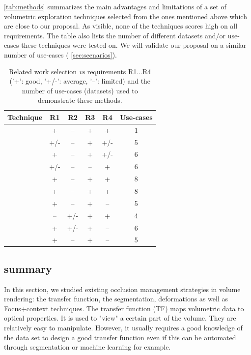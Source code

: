\autoref{tab:methods} summarizes the main advantages and limitations of a set of volumetric exploration techniques selected from the ones mentioned above which are close to our proposal. As visible, none of the techniques scores high on all requirements. The table also lists the number of different datasets and/or use-cases these techniques were tested on. We will validate our proposal on a similar number of use-cases ( \autoref{sec:scenarios}).
\begin{table}
\centering
\large
\begin{tabular}{ |c|c|c|c|c|c| }
\hline
\textbf{Technique} & \textbf{R1} & \textbf{R2} & \textbf{R3} & \textbf{R4} & \textbf{Use-cases}\\
\hline
\hline
\cite{1250400} & + & -- & + & + & 1\\
\cite{Sonnet:2004:IEA:989863.989871} & +/- & -- & + & +/- & 5\\
\cite{1532818} & + & -- & + & +/- & 6\\
\cite{4015467} & +/- & -- & -- & + & 6\\
\cite{Correa:2006:FAV:1187627.1187827} & + & -- & + & + & 8\\
\cite{Correa:2007:IDD:1313046.1313163} & + & -- & + & + & 8\\
\cite{5613463} & + & -- & + & -- & 5\\
\cite{Hsu:2011:RFM:2070781.2024165} & -- & +/- & + & + & 4\\
\cite{6787171} & + & +/- & + & -- & 6\\
\cite{7120994} & + & -- & + & -- & 5\\
\hline
\end{tabular}
\caption{Related work selection \emph{vs} requirements R1...R4 ('+': good, '+/-': average, '--': limited) and the number of use-cases (datasets) used to demonstrate these methods.}
\label{tab:methods}
\end{table}

\subsection{summary}
In this section, we studied existing occlusion management strategies in volume rendering: the transfer function, the segmentation, deformations as well as Focus+context techniques. 
The transfer function (TF) maps volumetric data to optical properties. It is used to "view" a certain part of the volume. They are relatively easy to manipulate. However, it usually requires a good knowledge of the data set to design a good transfer function even if this can be automated through segmentation or machine learning for example.



